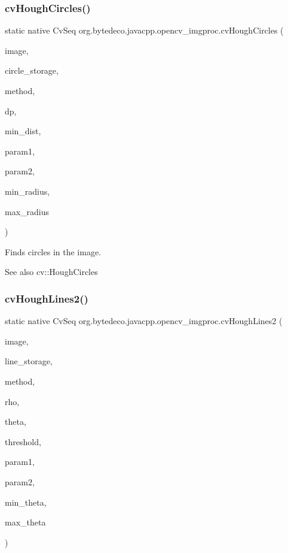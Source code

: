 \subsubsection{\texorpdfstring{cv\+Hough\+Circles()}{cvHoughCircles()}}
{\footnotesize\ttfamily static native Cv\+Seq org.\+bytedeco.\+javacpp.\+opencv\+\_\+imgproc.\+cv\+Hough\+Circles (\begin{DoxyParamCaption}\item[{Cv\+Arr}]{image,  }\item[{Pointer}]{circle\+\_\+storage,  }\item[{int}]{method,  }\item[{double}]{dp,  }\item[{double}]{min\+\_\+dist,  }\item[{double}]{param1,  }\item[{double}]{param2,  }\item[{int}]{min\+\_\+radius,  }\item[{int}]{max\+\_\+radius }\end{DoxyParamCaption})\hspace{0.3cm}{\ttfamily [static]}}



Finds circles in the image. 

\begin{DoxySeeAlso}{See also}
cv\+::\+Hough\+Circles 
\end{DoxySeeAlso}
\mbox{\label{group__imgproc__c_gafc3c62ef34d90e0357c5599049a75b95}} 
\subsubsection{\texorpdfstring{cv\+Hough\+Lines2()}{cvHoughLines2()}}
{\footnotesize\ttfamily static native Cv\+Seq org.\+bytedeco.\+javacpp.\+opencv\+\_\+imgproc.\+cv\+Hough\+Lines2 (\begin{DoxyParamCaption}\item[{Cv\+Arr}]{image,  }\item[{Pointer}]{line\+\_\+storage,  }\item[{int}]{method,  }\item[{double}]{rho,  }\item[{double}]{theta,  }\item[{int}]{threshold,  }\item[{double}]{param1,  }\item[{double}]{param2,  }\item[{double}]{min\+\_\+theta,  }\item[{double}]{max\+\_\+theta }\end{DoxyParamCaption})\hspace{0.3cm}{\ttfamily [static]}}



